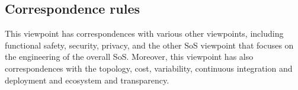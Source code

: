 

\subsection{Correspondence rules}\label{CRs}

%
%

This viewpoint has correspondences with various other viewpoints, including functional safety, security, privacy, and the other SoS viewpoint that focuses on the engineering of the overall SoS. Moreover, this viewpoint has also correspondences with the topology, cost, variability, continuous integration and deployment and ecosystem and transparency.
%


%
%
%
%

%
%

